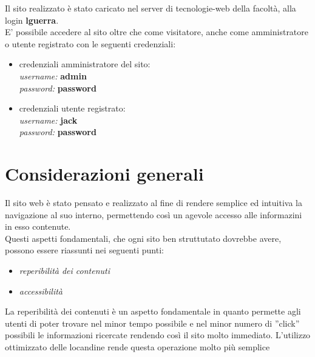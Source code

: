 \noindent Il sito realizzato è stato caricato nel server di tecnologie-web della facoltà, alla login \textbf{lguerra}.\\

\noindent E' possibile accedere al sito oltre che come visitatore, anche come amministratore o utente registrato con le seguenti credenziali:
\begin{itemize}


\item credenziali amministratore del sito:\\
\textit{username:} \textbf{admin}\\
\textit{password:} \textbf{password}
\item credenziali utente registrato:\\
\textit{username:} \textbf{jack}\\
\textit{password:} \textbf{password}\\
\end{itemize}


\section{Considerazioni generali}

Il sito web è stato pensato e realizzato al fine di rendere semplice ed intuitiva la navigazione al suo interno, permettendo così un agevole accesso alle informazini in esso contenute.\\
Questi aspetti fondamentali, che ogni sito ben struttutato dovrebbe avere, possono essere riassunti nei seguenti punti:
\begin{itemize}
\item \textit{reperibilità dei contenuti}
\item \textit{accessibilità}
\end{itemize}

\n La reperibilità dei contenuti è un aspetto fondamentale in quanto permette agli utenti di poter trovare nel minor tempo possibile e nel minor numero di ''click'' possibili le informazioni ricercate rendendo così il sito molto immediato. L'utilizzo ottimizzato delle locandine rende questa operazione molto più semplice\\


